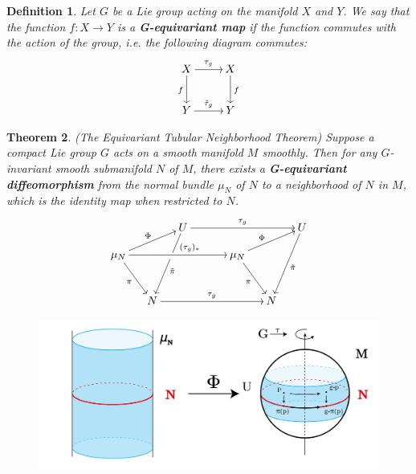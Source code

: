 \documentclass[reqno,11pt]{amsart}
\numberwithin{equation}{section}
\theoremstyle{plain}
\newtheorem{theorem}{Theorem}[section]
\newtheorem{defn}[theorem]{Definition}
\theoremstyle{plain}
\numberwithin{equation}{section}
\theoremstyle{remark}
\begin{document}
\begin{defn}
	Let $G$ be a Lie group acting on the manifold $X$ and $Y$. We say that the function $f:X\rightarrow Y$ is a \textbf{G-equivariant map} if the function commutes with the action of the group, i.e. the following diagram commutes:
	\begin{equation*}
		\SelectTips{eu}{12}
	\xymatrix{
		X\ar[r]^{\tau_g}\ar[d]_{f} & X\ar[d]^{f} \\
		Y\ar[r]^{\tilde{\tau}_g} & Y
	}
	\end{equation*}
\end{defn}
\begin{theorem}(The Equivariant Tubular Neighborhood Theorem)
	 Suppose a compact Lie group $G$
	acts on a smooth manifold $M$ smoothly. Then for any $G$-invariant smooth submanifold $N$
	of $M$, there exists a \textbf{G-equivariant diffeomorphism} from the normal bundle $\mu_N$ of $N$ to a
	neighborhood of $N$ in $M$, which is the identity map when restricted to $N$.
	\begin{equation*}
		\SelectTips{eu}{12}
	\xymatrix@R=0.4cm@C=0.45cm{
		&&U\ar[rrrr]^{\tau_g}&&&&U\\
		\mu_N\ar[rrrr]^(0.6){(\tau_g)_*}&&&&\mu_N&&\\
		&&&&&&\\
		&N\ar[rrrr]^{\tau_g}&&&&N&
		\ar"2,1";"1,3"^{\Phi}
		\ar"2,1";"4,2"_{\pi}
		\ar"1,3";"4,2"^(0.55){\tilde{\pi}}|(0.38)\hole
		\ar"2,5";"1,7"^(0.42){\Phi}
		\ar"2,5";"4,6"_{\pi}
		\ar"1,7";"4,6"^{\tilde{\pi}}		
	}
	\end{equation*}
\end{theorem}
\begin{figure}[th]
		\centering
		\includegraphics[width=\textwidth]{figures/final2-01.png}\\
		\caption{}
		\label{fig4}
\end{figure}
\end{document}
